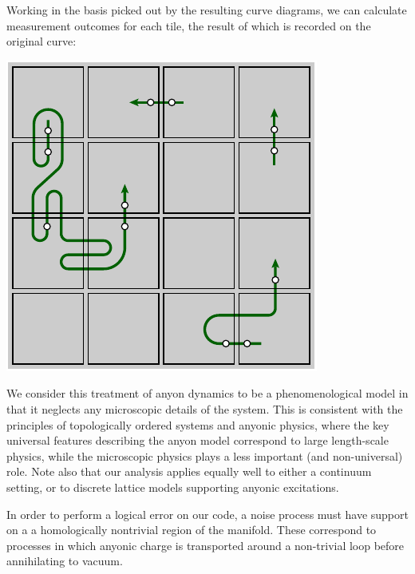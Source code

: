 Working in the basis picked out by the resulting curve
diagrams, we can calculate measurement outcomes for each tile,
the result of which is recorded on the original curve:
\begin{center}
\includegraphics[width=0.3\columnwidth ]{pic-curve-uniq.pdf}
\end{center}



We consider this treatment of anyon dynamics to be a phenomenological model in that
it neglects any microscopic details of the system.
This is consistent with the principles of topologically
ordered systems and anyonic physics, where the key universal features describing the
anyon model correspond to large length-scale physics, while the microscopic physics plays
a less important (and non-universal) role. Note also that our analysis applies equally well to either a continuum setting, or to discrete lattice models supporting anyonic excitations.

In order to perform a logical error on our code, a noise process must have support on a
a homologically nontrivial region of the manifold.
These correspond to processes in which anyonic charge is transported around a non-trivial loop before
annihilating to vacuum.





